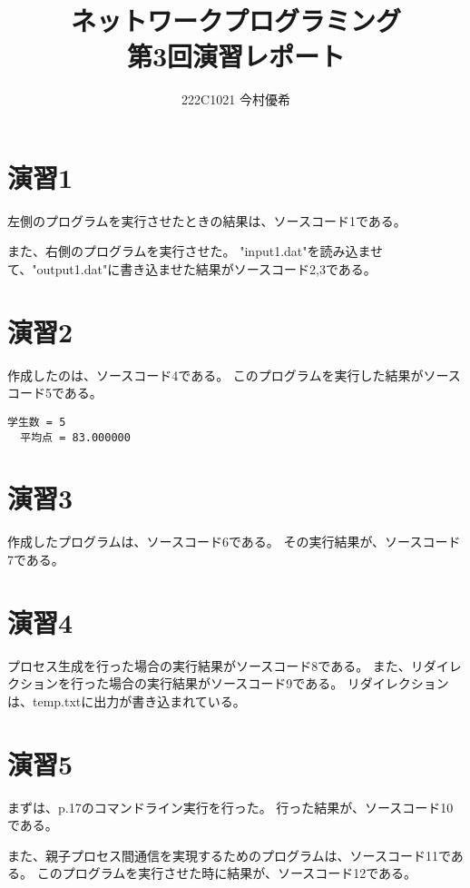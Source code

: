 \documentclass[documentclass]{jsarticle}
\begin{document}
\title{ネットワークプログラミング\\ 第3回演習レポート}
\author{222C1021 今村優希}
\maketitle

\newpage

\section*{演習1}
左側のプログラムを実行させたときの結果は、ソースコード1である。

また、右側のプログラムを実行させた。
"input1.dat"を読み込ませて、"output1.dat"に書き込ませた結果がソースコード2,3である。



\section*{演習2}
作成したのは、ソースコード4である。
このプログラムを実行した結果がソースコード5である。

\begin{lstlisting}[caption={実行結果}]
  学生数 = 5
  平均点 = 83.000000
\end{lstlisting}

\section*{演習3}
作成したプログラムは、ソースコード6である。
その実行結果が、ソースコード7である。



\section*{演習4}
プロセス生成を行った場合の実行結果がソースコード8である。
また、リダイレクションを行った場合の実行結果がソースコード9である。
リダイレクションは、temp.txtに出力が書き込まれている。



\section*{演習5}
まずは、p.17のコマンドライン実行を行った。
行った結果が、ソースコード10である。


また、親子プロセス間通信を実現するためのプログラムは、ソースコード11である。
このプログラムを実行させた時に結果が、ソースコード12である。


\end{document}
